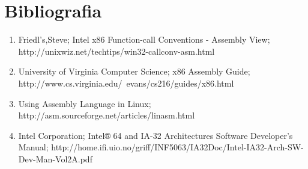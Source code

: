 \documentclass[twocolumn,11pts]{IEEEtran}
\begin{document}
\section{Bibliografia}
\begin{enumerate}
\item Friedl's,Steve; Intel x86 Function-call Conventions - Assembly View; http://unixwiz.net/techtips/win32-callconv-asm.html
\item University of Virginia Computer Science; x86 Assembly Guide; http://www.cs.virginia.edu/~evans/cs216/guides/x86.html
\item Using Assembly Language in Linux; http://asm.sourceforge.net/articles/linasm.html
\item Intel Corporation; Intel® 64 and IA-32 Architectures
Software Developer’s Manual; http://home.ifi.uio.no/griff/INF5063/IA32Doc/Intel-IA32-Arch-SW-Dev-Man-Vol2A.pdf
\end{enumerate}
\end{document}
